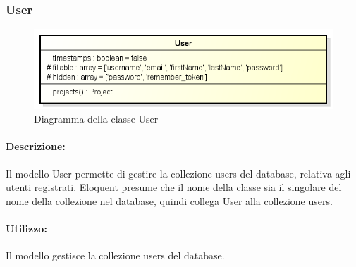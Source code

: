 \subsubsection{User}

	\begin{figure}[h]
		\centering
		\includegraphics[width=0.8\linewidth]{img/back_end_user_model}
		\caption[Diagramma della classe User]{Diagramma della classe User}
		\label{fig:back_end_user_model}
	\end{figure}


	\paragraph{Descrizione:}
	Il modello User permette di gestire la collezione users del \gls{database}, relativa agli utenti registrati. Eloquent presume che il nome della classe sia il singolare del nome della collezione nel \gls{database}, quindi collega User alla collezione users.

	\paragraph{Utilizzo:}
	Il modello gestisce la collezione users del \gls{database}.
	
